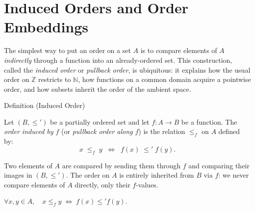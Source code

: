 
\section{Induced Orders and Order Embeddings}



\begin{exposition}
The simplest way to put an order on a set $A$ is to compare elements of $A$
\emph{indirectly} through a function into an already-ordered set. This
construction, called the \emph{induced order} or \emph{pullback order},
is ubiquitous: it explains how the usual order on $\mathbb{Z}$ restricts
to $\mathbb{N}$, how functions on a common domain acquire a pointwise order,
and how subsets inherit the order of the ambient space.
\end{exposition}

\begin{definitionbox}{Definition (Induced Order)}
\begin{definition}\label{def:induced-order}
Let $(B, \leq')$ be a partially ordered set and let $f : A \to B$ be a
function. The \emph{order induced by $f$} (or \emph{pullback order along
$f$}) is the relation $\leq_f$ on $A$ defined by:
\[
x \;\leq_f\; y
\;\;\Longleftrightarrow\;\;
f(x) \;\leq'\; f(y).
\]
\end{definition}
\end{definitionbox}

\begin{remark*}[Intuition]
Two elements of $A$ are compared by sending them through $f$ and comparing
their images in $(B, \leq')$. The order on $A$ is entirely inherited from
$B$ via $f$: we never compare elements of $A$ directly, only their
$f$-values.
\end{remark*}

\begin{remark*}
$\forall x, y \in A,\quad x \leq_f y \;\Longleftrightarrow\; f(x) \leq' f(y)$.
\end{remark*}

